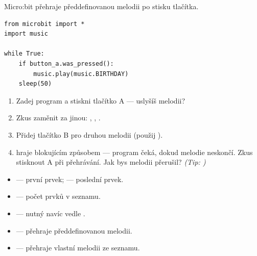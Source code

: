 \begin{ukol}

Micro:bit přehraje předdefinovanou melodii po stisku tlačítka.

\begin{lstlisting}
from microbit import *
import music

while True:
    if button_a.was_pressed():
        music.play(music.BIRTHDAY)
    sleep(50)
\end{lstlisting}

\begin{enumerate}
  \item Zadej program a stiskni tlačítko A — uslyšíš melodii?
  \item Zkus zaměnit  za jinou:
        , , .
  \item Přidej tlačítko B pro druhou melodii (použij ).
  \item {} hraje blokujícím způsobem — program čeká, dokud melodie neskončí.
        Zkus stisknout A při přehrávání.
        Jak bys melodii přerušil? \textit{(Tip: )}
\end{enumerate}

\odpoved[2cm]

\begin{tcolorbox}[colback=code-bg, colframe=gray!40,
                  fonttitle=\small\bfseries, title=Seznamy a hudba]
  \small
  \begin{itemize}[leftmargin=*]
    \item {} — první prvek;  — poslední prvek.
    \item {} — počet prvků v seznamu.
    \item {} — nutný navíc vedle .
    \item {} — přehraje předdefinovanou melodii.
    \item {} — přehraje vlastní melodii ze seznamu.
  \end{itemize}
\end{tcolorbox}

\end{ukol}

